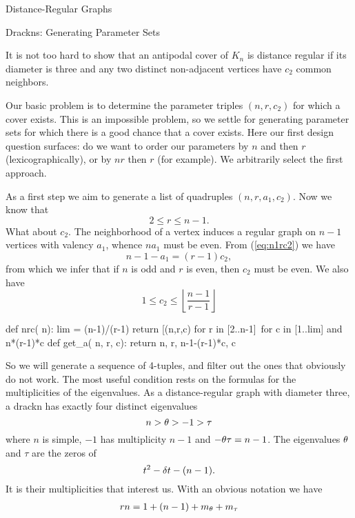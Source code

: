 \begin{chap}{Distance-Regular Graphs}
\begin{sect}{Drackns: Generating Parameter Sets}
\begin{para}
It is not too hard to show that an antipodal
cover of $K_n$ is distance regular if its diameter is three and any two 
distinct non-adjacent vertices have $c_2$ common neighbors.
\end{para}
%
\begin{para}
Our basic problem is to determine the parameter triples $(n,r,c_2)$
for which a cover exists. This is an impossible problem, so we settle
for generating parameter sets for which there is a good chance that a
cover exists. Here our first design question surfaces: do we want to order
our parameters by $n$ and then $r$ (lexicographically), or by $nr$ then $r$
(for example). We arbitrarily select the first approach.
\end{para}
%
\begin{para}
As a first step we aim to generate a list of quadruples $(n,r,a_1,c_2)$.
Now we know that
\begin{equation}
\label{eq:rbnd}
    2\le r\le n-1.
\end{equation}
What about $c_2$. The neighborhood of a vertex induces a regular graph
on $n-1$ vertices with valency $a_1$, whence $na_1$ must be even.
From (\ref{eq:n1rc2}) we have 
\[
    n-1-a_1 = (r-1)c_2,
\]
from which we infer that if $n$ is odd and $r$ is even, then $c_2$ must be
even. We also have
\begin{equation}
\label{c2bnd}
    1\le c_2 \le \left\lfloor\frac{n-1}{r-1}\right\rfloor
\end{equation}
\end{para}
%
\begin{sageblock}
    def nrc( n):
        lim = (n-1)/(r-1)
        return [(n,r,c) for r in [2..n-1]\ 
         for c in [1..lim] and n*(r-1)*c %
    def get_a( n, r, c):
        return n, r, n-1-(r-1)*c, c
\end{sageblock}
%
\begin{para}
So we will generate a sequence of 4-tuples, and filter out the ones
that obviously do not work. The most useful condition rests on the formulas
for the multiplicities of the eigenvalues. As a distance-regular graph
with diameter three, a drackn has exactly four distinct eigenvalues
\[
    n > \theta > -1 > \tau
\]
where $n$ is simple, $-1$ has multiplicity $n-1$ and $-\theta\tau=n-1$.
The eigenvalues $\theta$ and $\tau$ are the zeros of
\[
    t^2 -\delta t - (n-1).
\]
It is their multiplicities that interest us. With an obvious notation we have
\begin{align*}
    rn &= 1 + (n-1) +m_\th+m_\tau\\

\end{align*}
\end{para}
\end{sect}
\end{chap}
